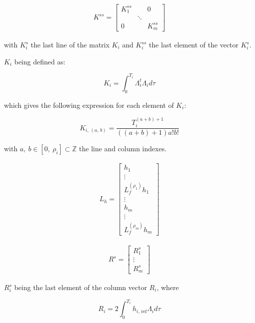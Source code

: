 \documentclass[letterpaper, 10 pt, conference]{ieeeconf}  %
\begin{document}
\begin{eqnarray}
K^{ss} = 
\left[
\begin{array}{ccc}
K^{ss}_1 & & 0\\
& \ddots &\\
0 & & K^{ss}_m
\end{array}\right]
\end{eqnarray}

with $K^{s}_i$ the last line of the matrix $K_i$ and $K^{ss}_i$ the last element of the vector $K^{s}_i$. 

$K_i$ being defined as:


\begin{equation*}
K_i = \int^{T_i}_0\Lambda_i^t\Lambda_id\tau  
\end{equation*}

which gives the following expression for each element of $K_i$:

\begin{equation*}
K_{i,\,(a,\,b)} = \frac{T_i^{(a+b)+1}}{((a+b)+1)a!b!}
\end{equation*}

with ${a,\ b \in [0,\ \rho_i] \subset \mathds{Z}}$ the line and column indexes.

\begin{eqnarray}
L_h = 
\left[\begin{array}{c}
h_1\\
\vdots\\
L_f^{(\rho_1)}h_1\\
\vdots\\
h_m\\
\vdots\\
L_f^{(\rho_m)}h_m
\end{array}\right]
\end{eqnarray}

\begin{eqnarray}
R^s = 
\left[\begin{array}{c}
R_1^s\\
\vdots\\
R_m^s
\end{array}\right]
\end{eqnarray}

${R^s_i}$ being the last element of the column vector $R_i$, where

\begin{equation*}
R_i = 2\int^{T_i}_0h_{i,\,\text{ref}}\Lambda_id\tau  
\end{equation*}
\end{document}
